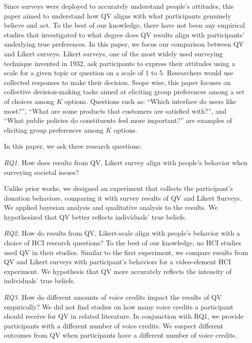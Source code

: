 
Since surveys were deployed to accurately understand people's attitudes, this paper aimed to understand how QV aligns with what participants genuinely believe and act. To the best of our knowledge, there have not been any empirical studies that investigated to what degree does QV results align with participants' underlying true preferences. In this paper, we focus our comparison between QV and Likert surveys. Likert surveys, one of the most widely used surveying technique invented in 1932, ask participants to express their attitudes using a scale for a given topic or question on a scale of 1 to 5. Researchers would use collected responses to make their decision. Scope wise, this paper focuses on collective decision-making tasks aimed at eliciting group preferences among a set of choices among $K$ options. Questions such as: ``Which interface do users like most?'', ``What are some products that customers are satisfied with?'', and  ``What public policies do constituents feel more important?'' are examples of eliciting group preferences among $K$ options.

In this paper, we ask three research questions: 

\textit{RQ1.} How does results from QV, Likert survey align with people's behavior when surveying societal issues? 

Unlike prior works, we designed an experiment that collects the participant's donation behaviors, comparing it with survey results of QV and Likert Surveys. We applied bayesian analysis and qualitative analysis to the results. We hypothesized that QV better reflects individuals' true beliefs. 

\textit{RQ2.} How do results from QV, Likert-scale align with people's behavior with a choice of HCI research questions? 
To the best of our knowledge, no  HCI studies used QV in their studies. Similar to the first experiment, we compare results from QV and Likert surveys with participant's behaviors for a video-element HCI experiment. We hypothesis that QV more accurately reflects the intensity of individuals' true beliefs. 

\textit{RQ3.} How do different amounts of voice credits impact the results of QV empirically?
We did not find studies on how many voice credits a participant should receive for QV in related literature. In conjunction with RQ1, we provide participants with a different number of voice credits. We suspect different outcomes from QV when participants have a different number of voice credits.


